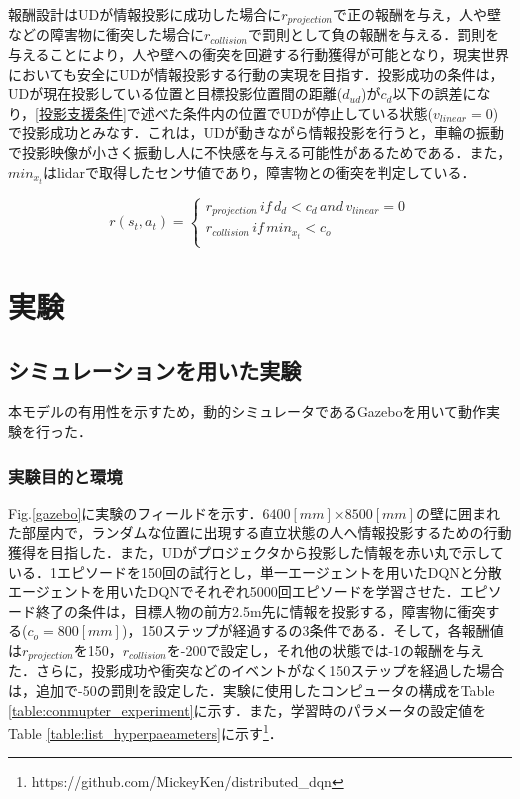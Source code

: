 \documentclass[12pt]{sonota/aislab}
\begin{document}
報酬設計はUDが情報投影に成功した場合に$r_{projection}$で正の報酬を与え，人や壁などの障害物に衝突した場合に$r_{collision}$で罰則として負の報酬を与える．罰則を与えることにより，人や壁への衝突を回避する行動獲得が可能となり，現実世界においても安全にUDが情報投影する行動の実現を目指す．投影成功の条件は，UDが現在投影している位置と目標投影位置間の距離($d_{ud}$)が$c_{d}$以下の誤差になり，\ref{投影支援条件}で述べた条件内の位置でUDが停止している状態($v_{linear}=0$)で投影成功とみなす．これは，UDが動きながら情報投影を行うと，車輪の振動で投影映像が小さく振動し人に不快感を与える可能性があるためである．また，$min_{x_t}$はlidarで取得したセンサ値であり，障害物との衝突を判定している．

\begin{equation}
r(s_{t},a_{t})= \left \{
\begin{array}{l}
r_{projection}\,if\,d_{d}<c_{d}\,and\,v_{linear}=0 \\
r_{collision}\,if\,min_{x_{t}} < c_{o} \\
\end{array}
\right.
\end{equation}


\chapter{実験}
\section{シミュレーションを用いた実験}
本モデルの有用性を示すため，動的シミュレータであるGazeboを用いて動作実験を行った．

\subsection{実験目的と環境}
Fig.\ref{gazebo}に実験のフィールドを示す．$6400[mm]$×$8500[mm]$の壁に囲まれた部屋内で，ランダムな位置に出現する直立状態の人へ情報投影するための行動獲得を目指した．また，UDがプロジェクタから投影した情報を赤い丸で示している．1エピソードを150回の試行とし，単一エージェントを用いたDQNと分散エージェントを用いたDQNでそれぞれ5000回エピソードを学習させた．エピソード終了の条件は，目標人物の前方2.5m先に情報を投影する，障害物に衝突する($c_{o}=800[mm]$)，150ステップが経過するの3条件である．そして，各報酬値は$r_{projection}$を150，$r_{collision}$を-200で設定し，それ他の状態では-1の報酬を与えた．さらに，投影成功や衝突などのイベントがなく150ステップを経過した場合は，追加で-50の罰則を設定した．実験に使用したコンピュータの構成をTable \ref{table:conmupter_experiment}に示す．また，学習時のパラメータの設定値をTable \ref{table:list_hyperpaeameters}に示す\footnote{https://github.com/MickeyKen/distributed\_dqn}．
\end{document}
